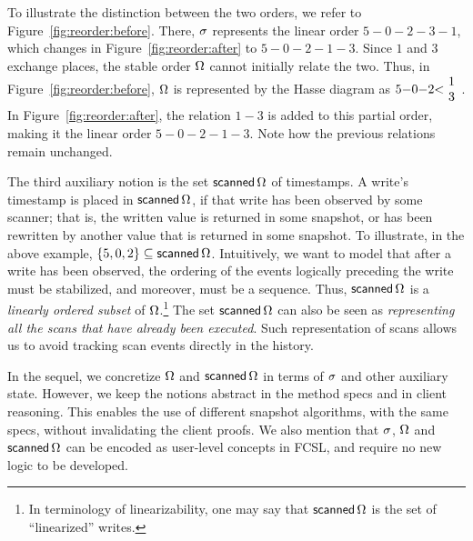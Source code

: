 To illustrate the distinction between the two orders, we refer to
Figure~\ref{fig:reorder:before}. There, $\sigma$ represents the
linear order $5{-}0{-}2{-}3{-}1$, which changes in
Figure~\ref{fig:reorder:after} to $5{-}0{-}2{-}1{-}3$.
%
Since $1$ and $3$ exchange places, the stable order $\Omega$
cannot initially relate the two. Thus, in
Figure~\ref{fig:reorder:before}, $\Omega$ is represented by
the Hasse diagram as
$5{-}0{-}2{<}\!\begin{array}[c]{c}1\\ 3\end{array}$. In
Figure~\ref{fig:reorder:after}, the relation $1{-}3$ is added to this
partial order, making it the linear order $5{-}0{-}2{-}1{-}3$. Note
how the previous relations remain unchanged.

\newcommand{\scanned}[1]{\mathsf{scanned}\,#1}

The third auxiliary notion is the set $\scanned\stableorder$ of
timestamps. A write's timestamp is placed in $\scanned\stableorder$,
if that write has been observed by some scanner; that is, the written
value is returned in some snapshot, or has been rewritten by another
value that is returned in some snapshot. To illustrate, in the above
example, $\{5, 0, 2\} \subseteq \scanned\stableorder$.  Intuitively,
we want to model that after a write has been observed, the ordering of
the events logically preceding the write must be stabilized, and
moreover, must be a sequence. Thus,
$\scanned\stableorder$ is a \emph{linearly ordered subset} of
$\Omega$.\footnote{In terminology of linearizability, one may
  say that $\scanned\stableorder$ is the set of ``linearized''
  writes.}  The set $\scanned\stableorder$ can also be seen as
\emph{representing all the scans that have already been
  executed}. Such representation of scans allows us to avoid tracking
scan events directly in the history.

In the sequel, we concretize $\Omega$ and
$\scanned\stableorder$ in terms of $\sigma$ and other auxiliary
state. However, we keep the notions abstract in the method specs and
in client reasoning. This enables the use of different snapshot
algorithms, with the same specs, without invalidating the client
proofs. We also mention that $\sigma$, $\Omega$ and
$\scanned\stableorder$ can be encoded as user-level concepts in FCSL,
and require no new logic to be developed.

